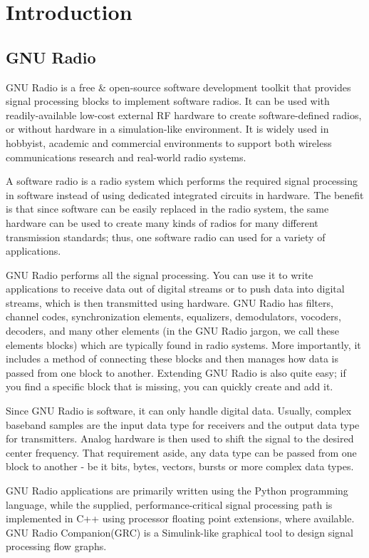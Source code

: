 \documentclass[a4paper,10pt]{report}
\begin{document}
\tableofcontents

\chapter{Introduction}

\section{GNU Radio}
GNU Radio\cite{bib:gnuradio} is a free \& open-source software development toolkit
that provides signal processing blocks to implement software radios.
It can be used with readily-available low-cost external RF hardware
to create software-defined radios, or without hardware in a simulation-like environment.
It is widely used in hobbyist, academic and commercial environments 
to support both wireless communications research and real-world radio systems.

A software radio is a radio system which performs the required signal processing 
in software instead of using dedicated integrated circuits in hardware.
The benefit is that since software can be easily replaced in the radio system,
the same hardware can be used to create many kinds of radios for many different transmission standards;
thus, one software radio can used for a variety of applications.

GNU Radio performs all the signal processing.
You can use it to write applications to receive data out of digital streams 
or to push data into digital streams, which is then transmitted using hardware.
GNU Radio has filters, channel codes, synchronization elements, equalizers,
demodulators, vocoders, decoders, and many other elements 
(in the GNU Radio jargon, we call these elements blocks) which are typically found in radio systems.
More importantly, it includes a method of connecting these blocks 
and then manages how data is passed from one block to another.
Extending GNU Radio is also quite easy; if you find a specific block that is missing, you can quickly create and add it.

Since GNU Radio is software, it can only handle digital data.
Usually, complex baseband samples are the input data type for receivers and the output data type for transmitters.
Analog hardware is then used to shift the signal to the desired center frequency.
That requirement aside, any data type can be passed from one block to another 
- be it bits, bytes, vectors, bursts or more complex data types.

GNU Radio applications are primarily written using the Python programming language, 
while the supplied, performance-critical signal processing path is implemented in C++
using processor floating point extensions, where available.
GNU Radio Companion(GRC) is a Simulink-like graphical tool to design signal processing flow graphs.
\end{document}
